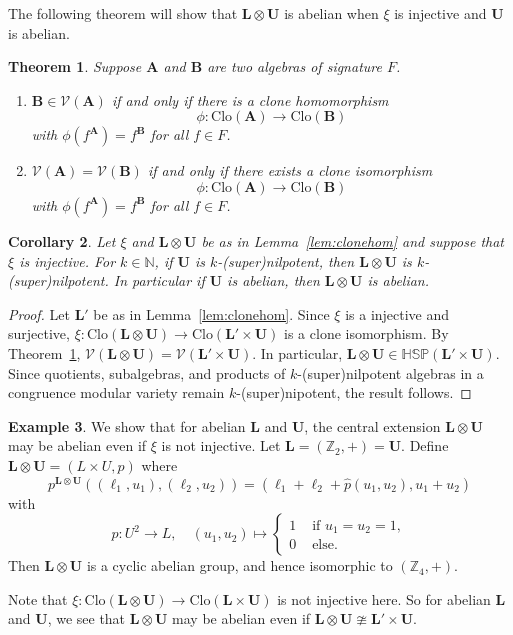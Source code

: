 \documentclass[12pt]{amsart}
\numberwithin{equation}{section}
\theoremstyle{plain}
\newtheorem{theorem}{Theorem}[section]
\newtheorem{cor}[theorem]{Corollary}
\theoremstyle{definition}
\newtheorem{exa}[theorem]{Example}
\newcommand{\A}{\mathbf{A}}
\newcommand{\B}{\mathbf{B}}
\renewcommand{\L}{\mathbf{L}}
\newcommand{\N}{\mathbb{N}}
\newcommand{\U}{\mathbf{U}}
\newcommand{\V}{\mathcal{V}}
\newcommand{\Z}{\mathbb{Z}}
\newcommand{\Clo}{\mathrm{Clo}}
\begin{document}
The following theorem will show that $\L \otimes \U$ is abelian when $\xi$ is injective and $\U$ is abelian. 

\begin{theorem}\cite[Theorem 9.3]{ALV:III} \label{ALV:clone} 
  Suppose $\A$ and $\B$ are two algebras of signature $F$. 
  \begin{enumerate}
    \item 
      $\B \in \V(\A)$ if and only if there is a clone homomorphism 
        \[\phi \colon \Clo(\A) \rightarrow \Clo(\B)\]
        with $\phi(f^\A) = f^\B$ for all $f \in F$.
    \item 
      $\V(\A) = \V(\B)$ if and only if there exists a clone isomorphism 
        \[\phi \colon \Clo(\A) \rightarrow \Clo(\B)\]
        with  $\phi(f^\A) = f^\B$ for all $f \in F$.
  \end{enumerate}
\end{theorem}

\begin{cor} 
  Let $\xi$ and $\L \otimes \U$  be as in Lemma~\ref{lem:clonehom} and suppose that $\xi$ is injective. 
  For $k \in \N$, if $\U$ is $k$-(super)nilpotent, then $\L \otimes \U$ is $k$-(super)nilpotent.
  In particular if $\U$ is abelian, then $\L \otimes \U$ is abelian. 
\end{cor}
\begin{proof}
  Let $\L'$ be as in Lemma~\ref{lem:clonehom}.
  Since $\xi$ is a injective and surjective, 
    $\xi \colon \Clo(\L \otimes \U) \rightarrow \Clo(\L' \times \U)$ is a clone isomorphism.
  By Theorem~\ref{ALV:clone}, $\V(\L \otimes \U) = \V(\L' \times \U)$.
  In particular, $\L \otimes \U \in \mathbb{HSP}(\L' \times \U)$.
  Since quotients, subalgebras, and products of $k$-(super)nilpotent algebras in a congruence modular variety 
  remain $k$-(super)nipotent, the result follows. 
\end{proof}

\begin{exa} 
  We show that for abelian $\L$ and $\U$, the central extension $\L \otimes \U$ may be abelian even if $\xi$ is not injective. %
  Let $\L = (\Z_2, +) = \U$. 
  Define $\L \otimes \U = (L \times U, p)$ 
    where 
    \[p^{\L \otimes \U}((\ell_1, u_1) , (\ell_2, u_2))= (\ell_1 + \ell_2 + \hat{p}(u_1,u_2), u_1 + u_2)\]
    with 
    \[ \hat{p} \colon U^2 \rightarrow L, \quad  (u_1, u_2) \mapsto 
      \begin{cases} 
        1  & \text{ if } u_1 = u_2 = 1, \\ 
        0 & \text{ else.} 
      \end{cases}\]
  Then $\L \otimes \U$ is a cyclic abelian group, and hence isomorphic to $(\Z_4, +)$.

  Note that $\xi \colon \Clo(\L \otimes \U) \rightarrow \Clo(\L \times \U)$ is not injective here. 
  So for abelian $\L$ and $\U$, we see that $\L \otimes \U$ may be abelian even if  $\L \otimes \U \ncong \L' \times \U$.
\end{exa}
\end{document}
